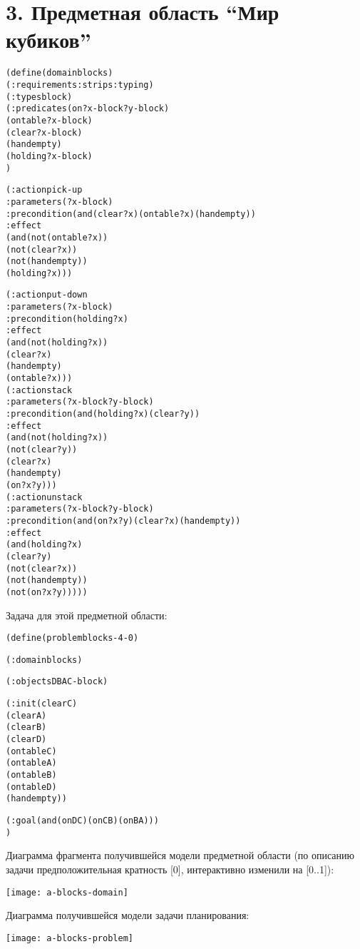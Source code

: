 \newpage

\def\sname{3. Предметная область ``Мир кубиков''}
\section*{\sname}

\begin{mdframed}[style=excode] 
\begin{alltt}
\small
(define (domain blocks)
  (:requirements :strips :typing)
  (:types block)
  (:predicates (on ?x - block ?y - block)
           (ontable ?x - block)
           (clear ?x - block)
           (handempty)
           (holding ?x - block)
           )

  (:action pick-up
         :parameters (?x - block)
         :precondition (and (clear ?x) (ontable ?x) (handempty))
         :effect
         (and (not (ontable ?x))
           (not (clear ?x))
           (not (handempty))
           (holding ?x)))

  (:action put-down
         :parameters (?x - block)
         :precondition (holding ?x)
         :effect
         (and (not (holding ?x))
           (clear ?x)
           (handempty)
           (ontable ?x)))
  (:action stack
         :parameters (?x - block ?y - block)
         :precondition (and (holding ?x) (clear ?y))
         :effect
         (and (not (holding ?x))
           (not (clear ?y))
           (clear ?x)
           (handempty)
           (on ?x ?y)))
  (:action unstack
         :parameters (?x - block ?y - block)
         :precondition (and (on ?x ?y) (clear ?x) (handempty))
         :effect
         (and (holding ?x)
           (clear ?y)
           (not (clear ?x))
           (not (handempty))
           (not (on ?x ?y)))))
\end{alltt}
\end{mdframed}

\newpage
Задача для этой предметной области:\\

\begin{mdframed}[style=excode] 
\begin{alltt}
\small
(define (problem blocks-4-0)

(:domain blocks)

(:objects D B A C - block)

(:init  (clear C) 
    (clear A) 
    (clear B) 
    (clear D) 
    (ontable C) 
    (ontable A)
    (ontable B) 
    (ontable D) 
    (handempty))

(:goal (and (on D C) (on C B) (on B A)))
)
\end{alltt}
\end{mdframed}

Диаграмма фрагмента получившейся модели предметной области (по описанию задачи предположительная кратность [0],  интерактивно изменили на [0..1]):\\

\centerline{
    \texttt{[image: a-blocks-domain]}
}

\newpage
Диаграмма получившейся модели задачи планирования:\\

\centerline{
    \texttt{[image: a-blocks-problem]}
}
